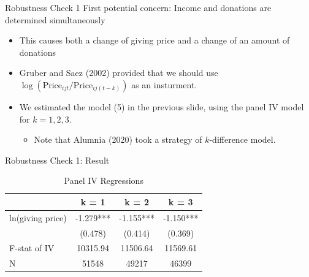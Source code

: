 \documentclass[
  ignorenonframetext,
]{beamer}
\providecommand{\tightlist}{%
  \setlength{\itemsep}{0pt}\setlength{\parskip}{0pt}}
\begin{document}
\begin{frame}{Robustness Check 1}
\protect\hypertarget{robustness-check-1}{}
First potential concern: Income and donations are determined simultaneously

\begin{itemize}
\tightlist
\item
  This causes both a change of giving price and a change of an amount of donations
\item
  Gruber and Saez (2002) provided that we should use \(\log(\text{Price}_{ijt}/\text{Price}_{ij(t-k)})\) as an insturment.
\item
  We estimated the model (5) in the previous slide, using the panel IV model for \(k = 1, 2, 3\).

  \begin{itemize}
  \tightlist
  \item
    Note that Alumnia (2020) took a strategy of \(k\)-difference model.
  \end{itemize}
\end{itemize}
\end{frame}

\begin{frame}{Robustness Check 1: Result}
\protect\hypertarget{robustness-check-1-result}{}
\begin{table}

\caption{\label{tab:kablePanelIVEstimateElasticity}Panel IV Regressions}
\centering
\begin{tabular}[t]{lccc}
\toprule
 & k = 1 & k = 2 & k = 3\\
\midrule
ln(giving price) & -1.279*** & -1.155*** & -1.150***\\
 & (0.478) & (0.414) & (0.369)\\
F-stat of IV & 10315.94 & 11506.64 & 11569.61\\
N & 51548 & 49217 & 46399\\
\bottomrule
\end{tabular}
\end{table}
\end{frame}
\end{document}
